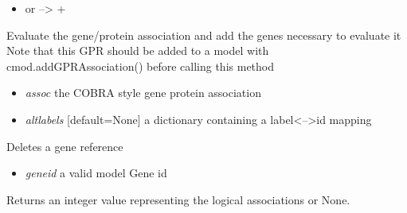 \documentclass[a4paper,11pt,english]{sphinxmanual}
\begin{document}
\begin{fulllineitems}
\begin{fulllineitems}
\begin{itemize}
\item {} 
or --\textgreater{} +

\end{itemize}

\end{fulllineitems}


\begin{fulllineitems}
\label{modules_doc:cbmpy.CBModel.GeneProteinAssociation.createAssociationAndGeneRefs}
Evaluate the gene/protein association and add the genes necessary to evaluate it
Note that this GPR should be added to a model with cmod.addGPRAssociation() before calling this method
\begin{itemize}
\item {} 
\emph{assoc} the COBRA style gene protein association

\item {} 
\emph{altlabels} {[}default=None{]} a dictionary containing a label\textless{}--\textgreater{}id mapping

\end{itemize}

\end{fulllineitems}


\begin{fulllineitems}
\label{modules_doc:cbmpy.CBModel.GeneProteinAssociation.deleteGeneref}
Deletes a gene reference
\begin{itemize}
\item {} 
\emph{geneid} a valid model Gene id

\end{itemize}

\end{fulllineitems}


\begin{fulllineitems}
\label{modules_doc:cbmpy.CBModel.GeneProteinAssociation.evalAssociation}
Returns an integer value representing the logical associations or None.


\end{fulllineitems}
\end{fulllineitems}
\end{document}
